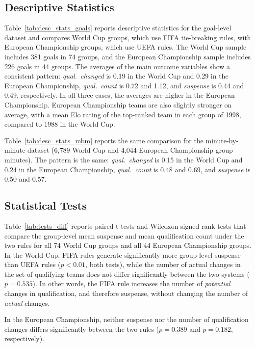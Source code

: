 \documentclass[11pt]{article}
\begin{document}
\subsection{Descriptive Statistics}


Table~\ref{tab:desc_stats_goals} reports descriptive statistics for the goal-level dataset and compares World Cup groups, which use FIFA tie-breaking rules, with European Championship groups, which use UEFA rules. The World Cup sample includes 381 goals in 74 groups, and the European Championship sample includes 226 goals in 44 groups. The averages of the main outcome variables show a consistent pattern: \textit{qual.\ changed} is 0.19 in the World Cup and 0.29 in the European Championship, \textit{qual.\ count} is 0.72 and 1.12, and \textit{suspense} is 0.44 and 0.49, respectively. In all three cases, the averages are higher in the European Championship. European Championship teams are also slightly stronger on average, with a mean Elo rating of the top-ranked team in each group of 1998, compared to 1988 in the World Cup.

Table~\ref{tab:desc_stats_mbm} reports the same comparison for the minute-by-minute dataset (6{,}789 World Cup and 4{,}044 European Championship group minutes). The pattern is the same: \textit{qual.\ changed} is 0.15 in the World Cup and 0.24 in the European Championship, \textit{qual.\ count} is 0.48 and 0.69, and \textit{suspense} is 0.50 and 0.57.





\subsection{Statistical Tests}

Table~\ref{tab:tests_diff} reports paired t-tests and Wilcoxon signed-rank tests that compare the group-level mean suspense and mean qualification count under the two rules for all 74 World Cup groups and all 44 European Championship groups. In the World Cup, FIFA rules generate significantly more group-level suspense than UEFA rules ($p<0.01$, both tests), while the number of actual changes in the set of qualifying teams does not differ significantly between the two systems ($p=0.535$). In other words, the FIFA rule increases the number of \textit{potential} changes in qualification, and therefore suspense, without changing the number of \textit{actual} changes.

In the European Championship, neither suspense nor the number of qualification changes differs significantly between the two rules ($p=0.389$ and $p=0.182$, respectively).
\end{document}
